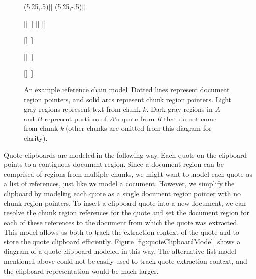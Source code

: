 \documentclass{acm_proc_article-sp}
\begin{document}
\begin{figure*}[t]
\begin{center}
\begin{graph}
(5.25,.5)[]
(5.25,-.5)[]




[]
[]
[]
[]

[]
[]

[]
[]


[]
[]


\end{graph}

\caption{An example reference chain model.  Dotted lines represent document region pointers, and solid arcs represent chunk region pointers.  Light gray regions represent text from chunk $k$.  Dark gray regions in $A$ and $B$ represent portions of $A$'s quote from $B$ that do not come from chunk $k$ (other chunks are omitted from this diagram for clarity).}
\label{fig:referenceChain}

\end{center}

\end{figure*}





Quote clipboards are modeled in the following way.
Each quote on the clipboard points to a contiguous document region.
Since a  document region can be comprised of regions from multiple chunks, we might want to model each quote as a list of references, just like we model a document.
However, we simplify the clipboard by modeling each quote as a single document region pointer with no chunk region pointers.
To insert a clipboard quote into a new document, we can resolve the chunk region references for the quote and set the document region for each of these references to the document from which the quote was extracted.
This model allows us both to track the extraction context of the quote and to store the quote clipboard efficiently.
Figure \ref{fig:quoteClipboardModel} shows a diagram of a quote clipboard modeled in this way.
The alternative list model mentioned above could not be easily used to track quote extraction context, and the clipboard representation would be much larger.
\end{document}
